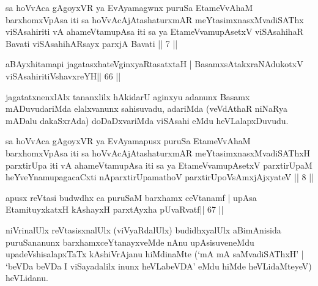 
\begin{kandikeshl}
sa hoVvAca gAgoyxVR ya EvAyamagwnx puruSa EtameVvAhaM barxhomxVpAsa iti sa hoVvAcAjAtashaturxmAR meYtasimxnasxMvadiSAThx viSAsa\-hiriti vA ahameVtamupAsa iti sa ya EtameVvamupAsetxV viSAsahihaR Bavati viSAsahihARsayx parxjA Bavati || 7 ||
\end{kandikeshl}


\begin{shl}
aBAyxhitamapi jagatasxhateV\s ginxyaRtasatxtaH |
BasamxsAtakxraNAdukotxV viSAsahiritiVshavxreYH\hfill || 66 ||
\end{shl}

\begin{artha}
jagatatxnenxlAlx tananxlilx hAkidarU aginxyu adanunx Basamx mADuvudariMda elalxvanunx sahisuvadu, adariMda (veVdAthaR niNaRya mADalu dakaSxrAda) doDaDxvariMda viSAsahi eMdu heVLalapxDuvudu.
\end{artha}


\begin{kandikeshl}
sa hoVvAca gAgoyxVR ya EvAyamapusx puruSa EtameVvAhaM barxhomxVpAsa iti sa hoVvAcAjAtashaturxmAR meYtasimxnasxMvadiSAThxH parxtirUpa iti vA ahameVtamupAsa iti sa ya EtameVvamupAsetxV parxtirUpaM heYveYnamupagacaCxti nAparxtirUpamathoV parxtirUpoV\s sAmxjAjxyateV || 8 ||
\end{kandikeshl}


\begin{shl}
apusx reVtasi budwdhx ca puruSaM barxhamx ceVtanamf |
upAsa EtamituyxkatxH kAshayxH parxtAyxha pUvaRvatf\hfill || 67 ||
\end{shl}

\begin{artha}
niVrinalUlx reVtasisxnalUlx (viVyaRdalUlx) budidhxyalUlx aBimAnisida  puruSananunx barxhamxceYtanayxveMde nAnu upAsisuveneMdu  upadeVshisalapxTaTx kAshiVrAjanu hiMdinaMte (`mA mA saMvadiSAThxH' | `beVDa beVDa I viSayadalilx inunx heVLabeVDA' eMdu hiMde heVLidaMteyeV) heVLidanu.
\end{artha}


